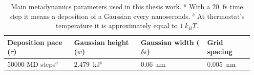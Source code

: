 \begin{table}[ht]
	\centering
	\begin{tabular}{llll}
		\toprule
		Deposition pace ($\tau$) & Gaussian height ($w$)& Gaussian width ($\delta s$) & Grid spacing \\ \toprule
		$50000$ \ac{MD} steps$^a$ & $2.479$~kJ$^b$ & $0.06$~nm & $0.005$~nm \\ \bottomrule
	\end{tabular}
	\caption{Main metadynamics parameters used in this thesis work. \footnotesize $^a$ With a $20$~fs time step it means a deposition of a Gaussian every nanoseconds. $^b$ At thermostat's temperature it is approximately equal to $1~k_BT$.}
	\label{tab:metadynParam}
\end{table}


